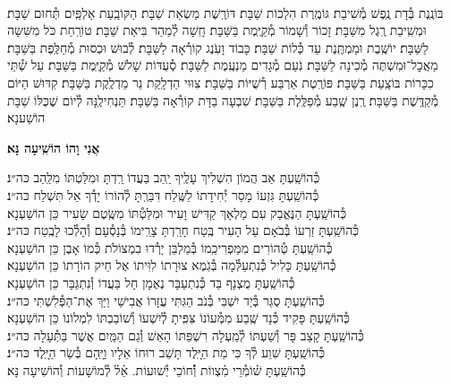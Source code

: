 \documentclass[twoside, openany, parskip=half, 11pt]{book}
\begin{document}
\sepline

\\
בּוֹנֶֽנֶת בְּ֯דָת נֶֽפֶשׁ מְ֯שִׁיבַת׃ גּוֹמֶֽרֶת הִלְכוֹת שַׁבָּת׃ דּוֹרֶֽשֶׁת מַשְׂאַת שַׁבָּת׃ הַקּוֹבַֽעַת אַלְפַּֽיִם תְּ֯חוּם שַׁבָּת׃ וּמְשִֽׁיבַת רֶֽגֶל מִשַּׁבָּת׃ זָכוֹר וְ֯שָׁמוֹר מְ֯קַיֶּֽמֶת בַּשַּׁבָּת׃ חָֽשָׁה לְ֯מַהֵר בִּיאַת שַׁבָּת׃ טוֹרַֽחַת כֹּל מִשִּׁשָּה לַשַּׁבָּת׃ יוֹשֶֽׁבֶת וּמַמְתֶּֽנֶת עַד כְּ֯לוֹת שַׁבָּת׃ כָּבוֹד וָעֹֽנֶג קוֹרְ֯אָה לַשַּׁבָּת׃ לְ֯בוּשׁ וּכְסוּת מְ֯חַלֶּֽפֶת בַּשַּׁבָּת׃ מַאֲכׇל־וּמִשְׁתֶּה מְ֯כִינָה לַשַּׁבָּת׃ נֹֽעַם מְ֯גָדִים מַנְעֶֽמֶת לַשַּׁבָּת׃ סְ֯עֻדּוֹת שָׁלֹשׁ מְ֯קַיֶּֽמֶת בַּשַּׁבָּת׃ עַל שְׁ֯תֵּי כִכָּרוֹת בּוֹצַֽעַת בַּשַּׁבָּת׃ פּוֹרֶֽטֶת אַרְבַּע רְ֯שֻׁיּוֹת בַּשַּׁבָּת׃ צִוּוּי הַדְלָֽקַת נֵר מַדְלֶֽקֶת בַּשַּׁבָּת׃ קִדּוּשׁ הַיּוֹם מְ֯קַדֶּֽשֶׁת בַּשַּׁבָּת׃ רֶֽנֶן שֶֽׁבַע מְ֯פַלֶּֽלֶת בַּשַּׁבָּת׃ שִׁבְעָה בַדָּת קוֹרְ֯אָה בַּשַּׁבָּת׃ תַּנְחִילֶֽנָּה לְ֯יוֹם שֶׁכֻּלּוֹ שַׁבָּת הוֹשַׁענָא׃

\begin{large}
\textbf{אֲנִי וָהוֹ הוֹשִֽׁיעָה נָּא׃}
\end{large}

\begin{small}
כְּ֯הוֹשַֽׁעְתָּ אַב הֲמוֹן הִשְׁלִיךְ עָלֶֽיךָ יַֽהַב בַּעֲדוֹ רַֽדְתָּ וּמִלַּטְתּוֹ מִלַּֽהַב \hfill כּה״נ׃\\
כְּ֯הוֹשַֽׁעְתָּ גִּזְעוֹ מָסַר יְ֯חִידָתוֹ לַשֶּֽׁלַח דִּבַּרְֽתָּ לְ֯הוֹרוֹ יָדְ֯ךָ אַל תִּשְׁלַח \hfill כּה״נ׃ \\
כְּ֯הוֹשַֽׁעְתָּ הַנֶּאֱבַק עִם מַלְאָךְ קַדִּישׁ וָעִיר וּמִלַּטְ֯תּוֹ מִשֶּֽׂטֶם שָׂעִיר \hfill כֵּן הוֹשַׁעְנָא׃ \\
כְּ֯הוֹשַֽׁעְתָּ זַרְעוֹ בְּ֯בֹאָם עַל הָעִיר בֶּֽטַח חָרַֽדְתָּ צָרֵֽימוֹ בְּ֯נָסְ֯עָם וְ֯הָלְ֯כוּ לָבֶֽטַח \hfill כּה״נ׃ \\
כְּ֯הוֹשַֽׁעְתָּ טְ֯הוֹרִים מִמַּפְרִיכֵֽמוֹ בְּ֯מַלְבֵּן יָרְ֯דוּ בִמְצוֹלֹת כְּ֯מוֹ אָבֶן \hfill כֵּן הוֹשַׁעְנָא׃ \\
כְּ֯הוֹשַֽׁעְתָּ כָּלִיל כְּ֯נִתְעַלְּ֯מָה בְּ֯גֹֽמֶא צוּרָתוֹ לִוִּיתוֹ אֶל חֵיק הוֹרָתוֹ \hfill כֵּן הוֹשַׁעְנָא׃ \\
כְּ֯הוֹשַֽׁעְתָּ מֻצְנָף בַּד כְּ֯נִתְעַבָּר נֶאֶמָן חָל בַּעֲדוֹ וְ֯נִתְגַּבָּר \hfill כֵּן הוֹשַׁעְנָא׃ \\
כְּ֯הוֹשַֽׁעְתָּ סֻגַּר בְּ֯יַד יִשְׁבִּי בְּ֯נֹב הַגִּתִּי עֲזָרוֹ אֲבִישַׁי וַיַּךְ אֶת־הַפְּ֯לִשְׁתִּי \hfill כּה״נ׃\\
כְּ֯הוֹשַֽׁעְתָּ פָּקִיד כְּ֯נָד שֶֽׁבַע מִמְּ֯עוֹנוֹ צִּפִּֽיתָ לְ֯יִשְׁעוֹ וְ֯שׁוֹבַבְתּוֹ לִמְלוֹנוֹ \hfill כֵּן הוֹשַׁעְנָא׃\\
כְּ֯הוֹשַֽׁעְתָּ קָצַב פָּר וְ֯שַׁעְתּוֹ לְ֯מַֽעְלָה רִשְׁפַּתּוֹ הָאֵשׁ וְ֯גַם הַמַּֽיִם אֲשֶׁר בַּתְּ֯עָלָה \hfill כּה״נ׃\\
כְּ֯הוֹשַֽׁעְתָּ שִׁוַע לְ֯ךָ כִּי מֵת הַיָּֽלֶד תָּשֵׁב רוּחוֹ אֵלָיו וַיָּֽהָם בְּ֯שַׂר הַיָּֽלֶד \hfill כּה״נ׃\\
כְּ֯הוֹשַֽׁעְתָּ שׁ֗וֹמְ֯רֵי מִ֗צְווֹת וְ֯֗חוֹכֵי יְ֯שׁוּעוֹת. אֵ֗ל֗ לְ֯מוֹשָׁעוֹת \hfill וְ֯הוֹשִׁיעָה נָּא׃\\

\end{small}
\end{document}
